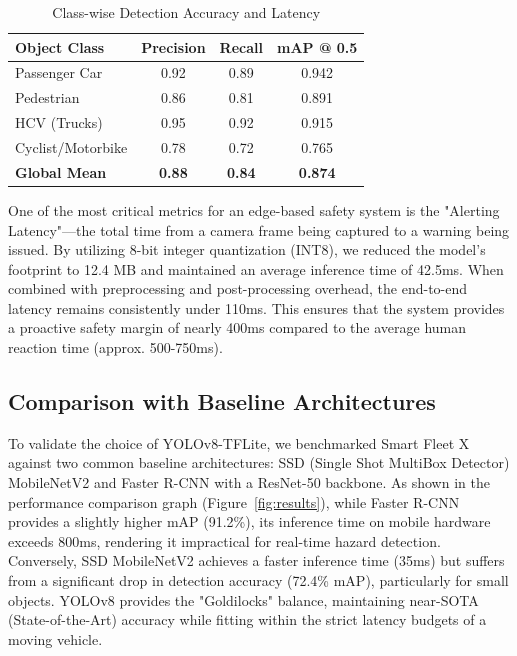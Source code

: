 \documentclass[conference]{IEEEtran}
\begin{document}
\begin{table}[htbp]
  \caption{Class-wise Detection Accuracy and Latency}
  \label{tab:class_metrics}
  \centering
  \begin{tabular}{lccc}
    \toprule
    Object Class & Precision & Recall & mAP @ 0.5 \\
    \midrule
    Passenger Car & 0.92 & 0.89 & 0.942 \\
    Pedestrian & 0.86 & 0.81 & 0.891 \\
    HCV (Trucks) & 0.95 & 0.92 & 0.915 \\
    Cyclist/Motorbike & 0.78 & 0.72 & 0.765 \\
    \textbf{Global Mean} & \textbf{0.88} & \textbf{0.84} & \textbf{0.874} \\
    \bottomrule
  \end{tabular}
\end{table}

One of the most critical metrics for an edge-based safety system is the "Alerting Latency"—the total time from a camera frame being captured to a warning being issued. By utilizing 8-bit integer quantization (INT8), we reduced the model's footprint to 12.4 MB and maintained an average inference time of 42.5ms. When combined with preprocessing and post-processing overhead, the end-to-end latency remains consistently under 110ms. This ensures that the system provides a proactive safety margin of nearly 400ms compared to the average human reaction time (approx. 500-750ms).

\subsection{Comparison with Baseline Architectures}
To validate the choice of YOLOv8-TFLite, we benchmarked Smart Fleet X against two common baseline architectures: SSD (Single Shot MultiBox Detector) MobileNetV2 and Faster R-CNN with a ResNet-50 backbone. As shown in the performance comparison graph (Figure~\ref{fig:results}), while Faster R-CNN provides a slightly higher mAP (91.2\%), its inference time on mobile hardware exceeds 800ms, rendering it impractical for real-time hazard detection. Conversely, SSD MobileNetV2 achieves a faster inference time (35ms) but suffers from a significant drop in detection accuracy (72.4\% mAP), particularly for small objects. YOLOv8 provides the "Goldilocks" balance, maintaining near-SOTA (State-of-the-Art) accuracy while fitting within the strict latency budgets of a moving vehicle.
\end{document}
